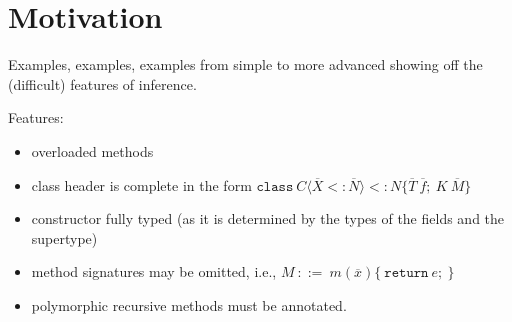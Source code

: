 \section{Motivation}
\label{sec:motivation}

Examples, examples, examples from simple to more advanced showing off
the (difficult) features of inference.

Features:
\begin{itemize}
\item overloaded methods
\item class header is complete in the form
  $\mathtt{class}\ C\langle\overline X <: \overline N\rangle <: N \{
  \overline T\ \overline f;\ K\ \overline M \}$
\item constructor fully typed (as it is determined by the types of the
  fields and the supertype)
\item method signatures may be omitted, i.e., 
  $M\ ::=\ m(\overline x) \{ \ \mathtt{return}\ e;\ \}$
\item polymorphic recursive methods must be annotated.
\end{itemize}

